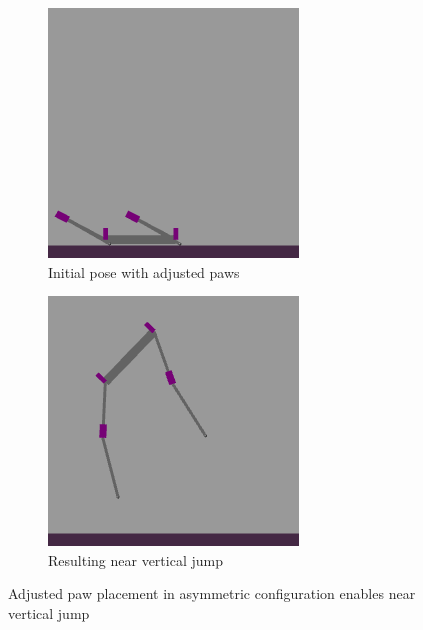 \begin{figure}[h]
    \centering
    \begin{subfigure}[b]{0.48\textwidth}
        \centering
        \includegraphics[width=\textwidth]{Images/link_length_optimization/adjusted_paw_pose.png}
        \caption{Initial pose with adjusted paws}
    \end{subfigure}
    \hfill
    \begin{subfigure}[b]{0.48\textwidth}
        \centering
        \includegraphics[width=\textwidth]{Images/link_length_optimization/adjusted_paw_jump.png}
        \caption{Resulting near vertical jump}
    \end{subfigure}
    \caption{Adjusted paw placement in asymmetric configuration enables near vertical jump}
    \label{fig:link_length_optimization:adjusted_jump}
\end{figure}


